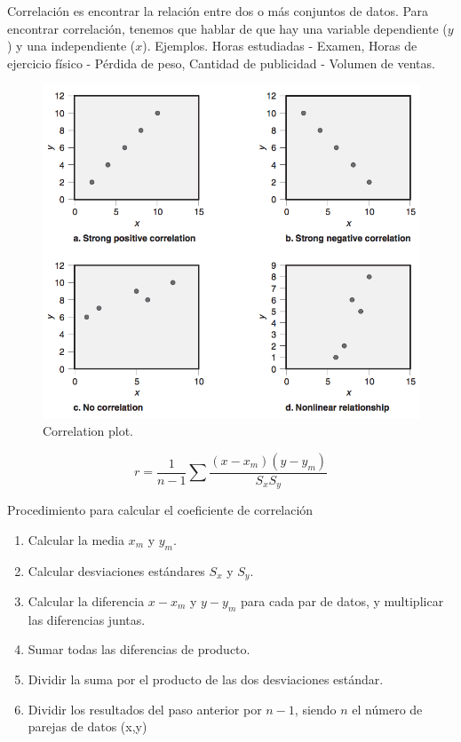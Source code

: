 \documentclass[]{article}
\begin{document}
Correlación es encontrar la relación entre dos o más conjuntos de datos. Para encontrar correlación, tenemos que hablar de que hay una variable dependiente ($y$) y una independiente ($x$). Ejemplos. Horas estudiadas - Examen, Horas de ejercicio físico - Pérdida de peso, Cantidad de publicidad - Volumen de ventas.

\begin{figure}[H]
	\centering
	\includegraphics[width=120mm]{imagenes/Correlation.png}
	\caption{Correlation plot.}
	\label{fig:Correlation}
\end{figure}

\begin{equation}
r = \frac{1}{n-1} \sum \frac{(x-x_m)(y-y_m)}{S_xS_y}
\end{equation}

Procedimiento para calcular el coeficiente de correlación

\begin{enumerate}
	\item Calcular la media $x_m$ y $y_m$.
	\item Calcular desviaciones estándares $S_x$ y $S_y$.
	\item Calcular la diferencia $x-x_m$ y $y-y_m$ para cada par de datos, y multiplicar las diferencias juntas.
	\item Sumar todas las diferencias de producto. 
	\item Dividir la suma por el producto de las dos desviaciones estándar. 
	\item Dividir los resultados del paso anterior por $n-1$, siendo $n$ el número de parejas de datos (x,y)
\end{enumerate}
\end{document}

